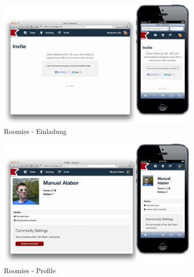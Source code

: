 \begin{figure}[H]
	\centering
	\includegraphics[width=0.9\textwidth]{content/appendix/roomies-screenshots/invite.png}
	\caption{Roomies - Einladung}
	\label{fig:roomies-ss-invite}
\end{figure}

\begin{figure}[H]
	\centering
	\includegraphics[width=0.9\textwidth]{content/appendix/roomies-screenshots/profile.png}
	\caption{Roomies - Profile}
	\label{fig:roomies-ss-profile}
\end{figure}
